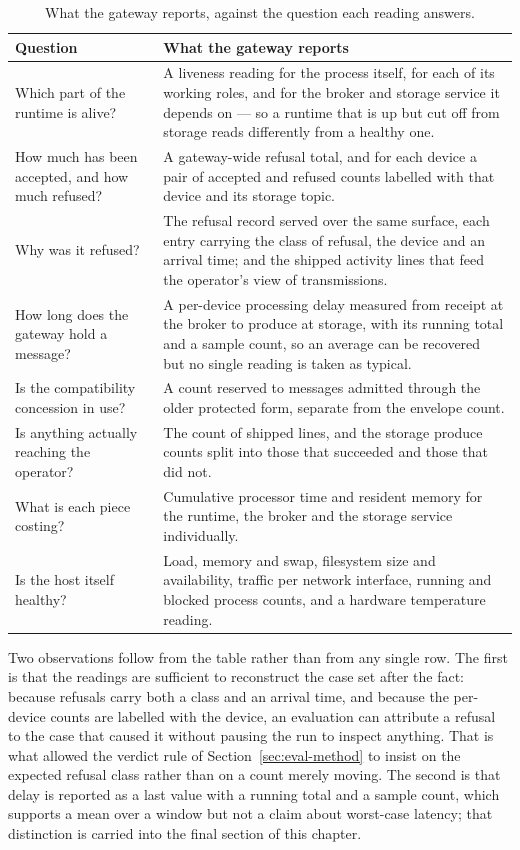 \documentclass[12pt,a4paper]{report}
\begin{document}
\begin{table}[htbp]
\centering
{\small
\begin{tabularx}{\textwidth}{@{}p{5.6cm}Y@{}}
\toprule
\textbf{Question} & \textbf{What the gateway reports} \\
\midrule
Which part of the runtime is alive?
& A liveness reading for the process itself, for each of
its working roles, and for the broker and storage service it
depends on --- so a runtime that is up but cut off from
storage reads differently from a healthy one. \\
\addlinespace
How much has been accepted, and how much refused?
& A gateway-wide refusal total, and for each device a pair
of accepted and refused counts labelled with that device and
its storage topic. \\
\addlinespace
Why was it refused?
& The refusal record served over the same surface, each
entry carrying the class of refusal, the device and an
arrival time; and the shipped activity lines that feed the
operator's view of transmissions. \\
\addlinespace
How long does the gateway hold a message?
& A per-device processing delay measured from receipt at the
broker to produce at storage, with its running total and a
sample count, so an average can be recovered but no single
reading is taken as typical. \\
\addlinespace
Is the compatibility concession in use?
& A count reserved to messages admitted through the older
protected form, separate from the envelope count. \\
\addlinespace
Is anything actually reaching the operator?
& The count of shipped lines, and the storage produce counts
split into those that succeeded and those that did not. \\
\addlinespace
What is each piece costing?
& Cumulative processor time and resident memory for the
runtime, the broker and the storage service individually. \\
\addlinespace
Is the host itself healthy?
& Load, memory and swap, filesystem size and availability,
traffic per network interface, running and blocked process
counts, and a hardware temperature reading. \\
\bottomrule
\end{tabularx}}
\caption{What the gateway reports, against the question each reading answers.}
\label{tab:eval-observability}
\end{table}

Two observations follow from the table rather than from any
single row. The first is that the readings are sufficient to
reconstruct the case set after the fact: because refusals
carry both a class and an arrival time, and because the
per-device counts are labelled with the device, an
evaluation can attribute a refusal to the case that caused
it without pausing the run to inspect anything. That is what
allowed the verdict rule of Section~\ref{sec:eval-method} to
insist on the expected refusal class rather than on a count
merely moving. The second is that delay is reported as a last
value with a running total and a sample count, which
supports a mean over a window but not a claim about
worst-case latency; that distinction is carried into the
final section of this chapter.
\end{document}
